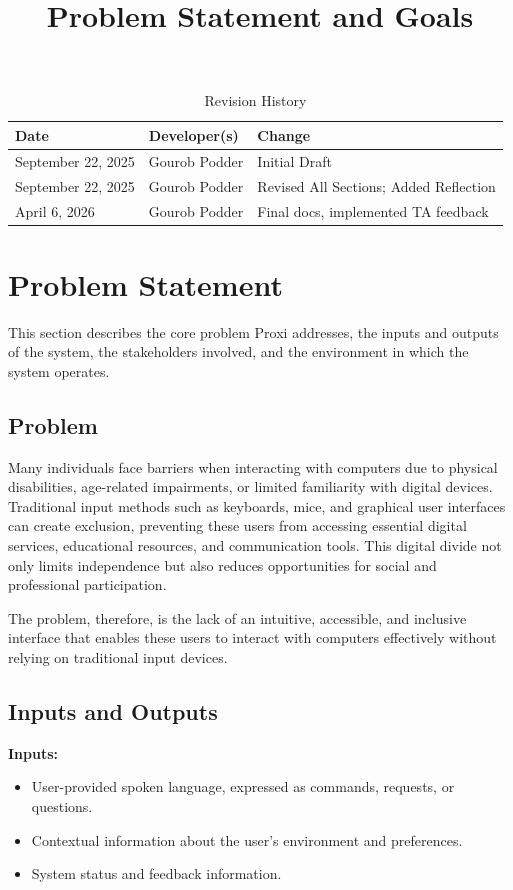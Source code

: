 \documentclass{article}
\title{Problem Statement and Goals\\\progname}
\author{\authname}
\date{}
\begin{document}
\maketitle

\begin{table}[hp]
\caption{Revision History} \label{TblRevisionHistory}
\begin{tabularx}{\textwidth}{llX}
\toprule
\textbf{Date} & \textbf{Developer(s)} & \textbf{Change}\\
\midrule
September 22, 2025 & Gourob Podder  & Initial Draft\\
September 22, 2025 & Gourob Podder  & Revised All Sections; Added Reflection\\
April 6, 2026 & Gourob Podder & Final docs, implemented TA feedback\\
\bottomrule
\end{tabularx}
\end{table}

\section{Problem Statement}

This section describes the core problem Proxi addresses, the inputs and outputs of the system, the stakeholders involved, and the environment in which the system operates.

\subsection{Problem}
Many individuals face barriers when interacting with computers due to physical disabilities, age-related impairments, or limited familiarity with digital devices. Traditional input methods such as keyboards, mice, and graphical user interfaces can create exclusion, preventing these users from accessing essential digital services, educational resources, and communication tools. This digital divide not only limits independence but also reduces opportunities for social and professional participation.

The problem, therefore, is the lack of an intuitive, accessible, and inclusive interface that enables these users to interact with computers effectively without relying on traditional input devices.

\subsection{Inputs and Outputs}
\textbf{Inputs:}
\begin{itemize}
    \item User-provided spoken language, expressed as commands, requests, or questions.
    \item Contextual information about the user's environment and preferences.
    \item System status and feedback information.
\end{itemize}
\end{document}
